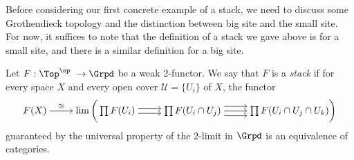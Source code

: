 \begin{remark}
Before considering our first concrete example of a stack, we need to discuss some Grothendieck topology and the distinction between big site and the small site. For now, it suffices to note that the definition of a stack we gave above is for a small site, and there is a similar definition for a big site.
\end{remark}
\begin{definition}
Let $F: \Top^\op \ \to \Grpd$ be a weak 2-functor. We say that $F$ is a \textit{stack} if for every space $X$ and every open cover $\mathcal{U} = \{U_i\}$ of $X$, the functor
\[\begin{tikzcd}[cramped]
	{F(X)} & {\lim \bigg( \prod F(U_i)} & {\prod F(U_i \cap U_j)} & {\prod F(U_i \cap U_j \cap U_k) \bigg)}
	\arrow["\cong", from=1-1, to=1-2]
	\arrow[shift right, from=1-2, to=1-3]
	\arrow[shift left, from=1-2, to=1-3]
	\arrow[from=1-3, to=1-4]
	\arrow[shift left=2, from=1-3, to=1-4]
	\arrow[shift right=2, from=1-3, to=1-4]
\end{tikzcd}\]
guaranteed by the universal property of the $2$-limit in $\Grpd$ is an equivalence of categories. 
\end{definition}
